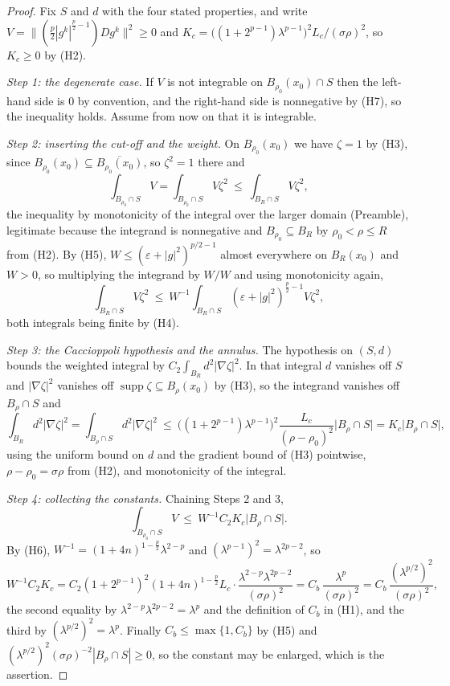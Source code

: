 \begin{proof}
Fix $S$ and $d$ with the four stated properties, and write
$V=\bigl\|(\tfrac p2|g^k|^{\frac p2-1})Dg^k\bigr\|^2\ge0$ and
$K_c=\bigl((1+2^{p-1})\lambda^{p-1}\bigr)^2L_c/(\sigma\rho)^2$, so $K_c\ge0$ by
(H2).

\emph{Step 1: the degenerate case.}  If $V$ is not integrable on
$B_{\rho_0}(x_0)\cap S$ then the left-hand side is $0$ by convention, and the
right-hand side is nonnegative by (H7), so the inequality holds.  Assume from
now on that it is integrable.

\emph{Step 2: inserting the cut-off and the weight.}  On $B_{\rho_0}(x_0)$ we
have $\zeta=1$ by (H3), since $B_{\rho_0}(x_0)\subseteq\overline{B_{\rho_0}(x_0)}$,
so $\zeta^2=1$ there and
\[
\int_{B_{\rho_0}\cap S}V=\int_{B_{\rho_0}\cap S}V\zeta^2
\ \le\ \int_{B_R\cap S}V\zeta^2 ,
\]
the inequality by monotonicity of the integral over the larger domain
(Preamble), legitimate because the integrand is nonnegative and
$B_{\rho_0}\subseteq B_R$ by $\rho_0<\rho\le R$ from (H2).  By (H5),
$W\le(\varepsilon+|g|^2)^{p/2-1}$ almost everywhere on $B_R(x_0)$ and $W>0$, so
multiplying the integrand by $W/W$ and using monotonicity again,
\[
\int_{B_R\cap S}V\zeta^2
\ \le\ W^{-1}\int_{B_R\cap S}(\varepsilon+|g|^2)^{\frac p2-1}V\zeta^2 ,
\]
both integrals being finite by (H4).

\emph{Step 3: the Caccioppoli hypothesis and the annulus.}  The hypothesis on
$(S,d)$ bounds the weighted integral by $C_2\int_{B_R}d^2|\nabla\zeta|^2$.  In
that integral $d$ vanishes off $S$ and $|\nabla\zeta|^2$ vanishes off
$\operatorname{supp}\zeta\subseteq B_\rho(x_0)$ by (H3), so the integrand
vanishes off $B_\rho\cap S$ and
\[
\int_{B_R}d^2|\nabla\zeta|^2=\int_{B_\rho\cap S}d^2|\nabla\zeta|^2
\ \le\ \bigl((1+2^{p-1})\lambda^{p-1}\bigr)^2\frac{L_c}{(\rho-\rho_0)^2}
  \bigl|B_\rho\cap S\bigr|
=K_c\bigl|B_\rho\cap S\bigr| ,
\]
using the uniform bound on $d$ and the gradient bound of (H3) pointwise,
$\rho-\rho_0=\sigma\rho$ from (H2), and monotonicity of the integral.

\emph{Step 4: collecting the constants.}  Chaining Steps 2 and 3,
\[
\int_{B_{\rho_0}\cap S}V\ \le\ W^{-1}C_2K_c\bigl|B_\rho\cap S\bigr| .
\]
By (H6), $W^{-1}=(1+4n)^{1-\frac p2}\lambda^{2-p}$ and
$(\lambda^{p-1})^2=\lambda^{2p-2}$, so
\[
W^{-1}C_2K_c
=C_2(1+2^{p-1})^2(1+4n)^{1-\frac p2}L_c\cdot
  \frac{\lambda^{2-p}\lambda^{2p-2}}{(\sigma\rho)^2}
=C_b\,\frac{\lambda^{p}}{(\sigma\rho)^2}
=C_b\,\frac{(\lambda^{p/2})^2}{(\sigma\rho)^2},
\]
the second equality by $\lambda^{2-p}\lambda^{2p-2}=\lambda^{p}$ and the
definition of $C_b$ in (H1), and the third by
$(\lambda^{p/2})^2=\lambda^{p}$.  Finally $C_b\le\max\{1,C_b\}$ by (H5) and
$(\lambda^{p/2})^2(\sigma\rho)^{-2}|B_\rho\cap S|\ge0$, so the constant may be
enlarged, which is the assertion.
\end{proof}
